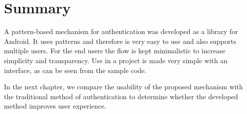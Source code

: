 \section{Summary}
A pattern-based mechanism for authentication was developed as a library for Android. It uses patterns and therefore is very easy to use and also supports multiple users. For the end users the flow is kept minimalistic to increase simplicity and transparency. Use in a project is made very simple with an interface, as can be seen from the sample code. 

In the next chapter, we compare the usability of the proposed mechanism with the traditional method of authentication to determine whether the developed method improves user experience.



